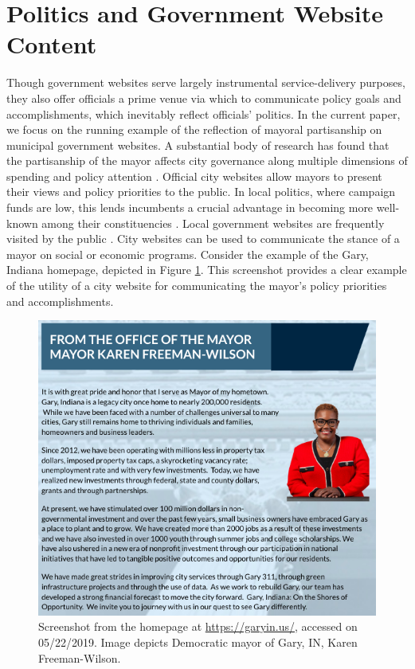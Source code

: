 \documentclass[11pt]{article}
\begin{document}
\section{Politics and Government Website Content}


 Though government websites serve largely instrumental service-delivery purposes, they also offer officials a prime venue via which to communicate policy goals and accomplishments, which inevitably reflect officials' politics. In the current paper, we focus on the running example of the reflection of mayoral partisanship on municipal government websites. A substantial body of research has found that the partisanship of the mayor affects city governance along multiple dimensions of spending and policy attention \citep{gerber2011mayors,de2016mayoral,einstein2016mayors,marion2013mayor}. Official city websites allow mayors to present their views and policy priorities to the public. In local politics, where campaign funds are low, this lends incumbents a crucial advantage in becoming more well-known among their constituencies \citep{stanyer2008elected}. Local government websites are frequently visited by the public \citep{thomas2003new}. City websites can be used to communicate the stance of a mayor on social or economic programs. Consider the example of the Gary, Indiana homepage, depicted in Figure \ref{fig:garymayor}.  This screenshot provides a clear example of the utility of a city website for communicating the mayor's policy priorities and accomplishments.
 
\begin{figure}
\centering
\includegraphics[scale=0.45]{figures/gary_hp}
\caption{Screenshot from the homepage at \url{https://garyin.us/}, accessed on 05/22/2019. Image depicts Democratic mayor of Gary, IN, Karen Freeman-Wilson.}
\label{fig:garymayor}
\end{figure}
\end{document}
